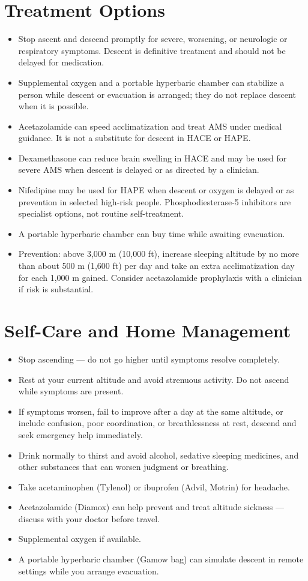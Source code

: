 \section*{Treatment Options}
\begin{itemize}
  \item Stop ascent and descend promptly for severe, worsening, or neurologic or respiratory symptoms. Descent is definitive treatment and should not be delayed for medication.
  \item Supplemental oxygen and a portable hyperbaric chamber can stabilize a person while descent or evacuation is arranged; they do not replace descent when it is possible.
  \item Acetazolamide can speed acclimatization and treat AMS under medical guidance. It is not a substitute for descent in HACE or HAPE.
  \item Dexamethasone can reduce brain swelling in HACE and may be used for severe AMS when descent is delayed or as directed by a clinician.
  \item Nifedipine may be used for HAPE when descent or oxygen is delayed or as prevention in selected high-risk people. Phosphodiesterase-5 inhibitors are specialist options, not routine self-treatment.
  \item A portable hyperbaric chamber can buy time while awaiting evacuation.
  \item Prevention: above 3,000 m (10,000 ft), increase sleeping altitude by no more than about 500 m (1,600 ft) per day and take an extra acclimatization day for each 1,000 m gained. Consider acetazolamide prophylaxis with a clinician if risk is substantial.
\end{itemize}

\section*{Self-Care and Home Management}
\begin{itemize}
  \item Stop ascending — do not go higher until symptoms resolve completely.
  \item Rest at your current altitude and avoid strenuous activity. Do not ascend while symptoms are present.
  \item If symptoms worsen, fail to improve after a day at the same altitude, or include confusion, poor coordination, or breathlessness at rest, descend and seek emergency help immediately.
  \item Drink normally to thirst and avoid alcohol, sedative sleeping medicines, and other substances that can worsen judgment or breathing.
  \item Take acetaminophen (Tylenol) or ibuprofen (Advil, Motrin) for headache.
  \item Acetazolamide (Diamox) can help prevent and treat altitude sickness — discuss with your doctor before travel.
  \item Supplemental oxygen if available.
  \item A portable hyperbaric chamber (Gamow bag) can simulate descent in remote settings while you arrange evacuation.
\end{itemize}

